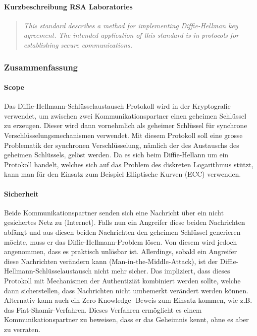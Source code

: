 \documentclass[10pt,a4paper]{article}
\begin{document}
\paragraph{Kurzbeschreibung RSA Laboratories}

\begin{quotation}
    \itshape This standard describes a method for implementing Diffie-Hellman key
    agreement. The intended application of this standard is in protocols for establishing
    secure communications.
\end{quotation}

\subsubsection{Zusammenfassung}

\paragraph{Scope}
Das Diffie-Hellmann-Schlüsselaustausch Protokoll wird in der Kryptografie verwendet, um
zwischen zwei Kommunikationspartner einen geheimen Schlüssel zu erzeugen. Dieser wird dann
vornehmlich als geheimer Schlüssel für synchrone Verschlüsselungsmechanismen verwendet.
Mit diesem Protokoll soll eine grosse Problematik der synchronen Verschlüsselung, nämlich
der des Austauschs des geheimen Schlüssels, gelöst werden. Da es sich beim Diffie-Hellann
um ein Protokoll handelt, welches sich auf das Problem des diskreten Logarithmus stützt,
kann man für den Einsatz zum Beispiel Elliptische Kurven (ECC) verwenden.

\paragraph{Sicherheit}
Beide Kommunikationspartner senden sich eine Nachricht über ein nicht gesichertes Netz zu
(Internet). Falls nun ein Angreifer diese beiden Nachrichten abfängt und aus diesen beiden
Nachrichten den geheimen Schlüssel generieren möchte, muss er das Diffie-Hellmann-Problem
lösen. Von diesem wird jedoch angenommen, dass es praktisch unlösbar ist. Allerdings,
sobald ein Angreifer diese Nachrichten verändern kann (Man-in-the-Middle-Attack), ist der
Diffie- Hellmann-Schlüsselaustausch nicht mehr sicher.  Das impliziert, dass dieses
Protokoll mit Mechanismen der Authentiziät kombiniert werden sollte, welche dann
sicherstellen, dass Nachrichten nicht umbemerkt verändert werden können. Alternativ kann
auch ein Zero-Knowledge- Beweis zum Einsatz kommen, wie z.B. das Fiat-Shamir-Verfahren.
Dieses Verfahren ermöglicht es einem Kommunikationspartner zu beweisen, dass er das
Geheimnis kennt, ohne es aber zu verraten.
\end{document}
